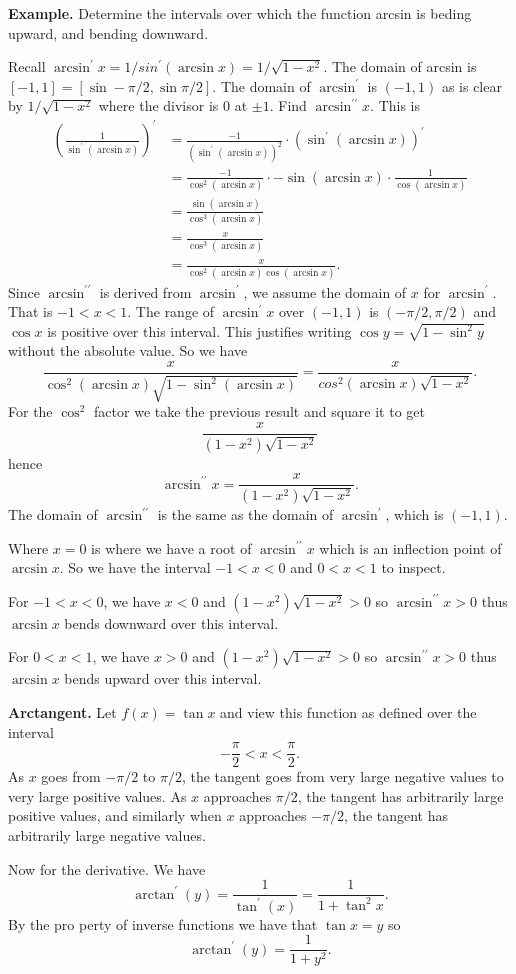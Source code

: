           \textbf{Example.} Determine the intervals over which the function arcsin is beding upward, and bending downward.

          Recall $\arcsin^\prime x = 1/sin^\prime(\arcsin x) = 1/\sqrt{1 - x^2}$. The domain of arcsin is $[-1, 1] = [\sin -\pi/2, \sin \pi/2]$. The domain of $\arcsin^\prime$ is $(-1, 1)$ as is clear by $1/\sqrt{1 - x^2}$ where the divisor is $0$ at $\pm 1$.
          Find $\arcsin^{\prime\prime} x$. This is
          \begin{align*}
            (\frac{1}{\sin^\prime(\arcsin x)})^\prime &= \frac{-1}{(\sin^\prime(\arcsin x))^2} \cdot (\sin^\prime(\arcsin x))^\prime\\
            &= \frac{-1}{\cos^2(\arcsin x)} \cdot -\sin(\arcsin x) \cdot \frac{1}{\cos(\arcsin x)}\\
            &= \frac{\sin(\arcsin x)}{\cos^3(\arcsin x)}\\
            &= \frac{x}{\cos^3(\arcsin x)}\\
            &= \frac{x}{\cos^2(\arcsin x)\cos(\arcsin x)}.
          \end{align*}
          Since $\arcsin^{\prime\prime}$ is derived from $\arcsin^\prime$, we assume the domain of $x$ for $\arcsin^\prime$. That is $-1 < x < 1$. The range of $\arcsin^\prime x$ over $(-1, 1)$ is $(-\pi/2, \pi/2)$ and $\cos x$ is positive over this interval. This justifies writing $\cos y = \sqrt{1 - \sin^2 y}$ without the absolute value. So we have
          \[\frac{x}{\cos^2(\arcsin x)\sqrt{1 - \sin^2(\arcsin x)}} = \frac{x}{cos^2(\arcsin x)\sqrt{1 - x^2}}.\]
          For the $\cos^2$ factor we take the previous result and square it to get
          \[\frac{x}{(1 - x^2)\sqrt{1 - x^2}}\]
          hence
          \[\arcsin^{\prime\prime} x = \frac{x}{(1 - x^2)\sqrt{1 - x^2}}.\]  
          The domain of $\arcsin^{\prime\prime}$ is the same as the domain of $\arcsin^\prime$, which is $(-1, 1)$.

          Where $x = 0$ is where we have a root of $\arcsin^{\prime\prime} x$ which is an inflection point of $\arcsin x$. So we have the interval $-1 < x < 0$ and $0 < x < 1$ to inspect.

          For $-1 < x < 0$, we have $x < 0$ and $(1 - x^2)\sqrt{1 - x^2} > 0$ so $\arcsin^{\prime\prime} x > 0$ thus $\arcsin x$ bends downward over this interval.

          For $0 < x < 1$, we have $x > 0$ and $(1 - x^2)\sqrt{1 - x^2} > 0$ so $\arcsin^{\prime\prime} x > 0$ thus $\arcsin x$ bends upward over this interval.

\textbf{Arctangent.} Let $f(x) = \tan x$ and view this function as defined over the interval
\[-\frac{\pi}{2} < x < \frac{\pi}{2}.\]
As $x$ goes from $-\pi/2$ to $\pi/2$, the tangent goes from very large negative values to very large positive values. As $x$ approaches $\pi/2$, the tangent has arbitrarily large positive values, and similarly when $x$ approaches $-\pi/2$, the tangent has arbitrarily large negative values.

          Now for the derivative. We have
          \[\arctan^\prime(y) = \frac{1}{\tan^\prime(x)} = \frac{1}{1 + \tan^2x}.\]
          By the pro perty of inverse functions we have that $\tan x = y$ so
          \[\arctan^\prime(y) = \frac{1}{1 + y^2}.\]
